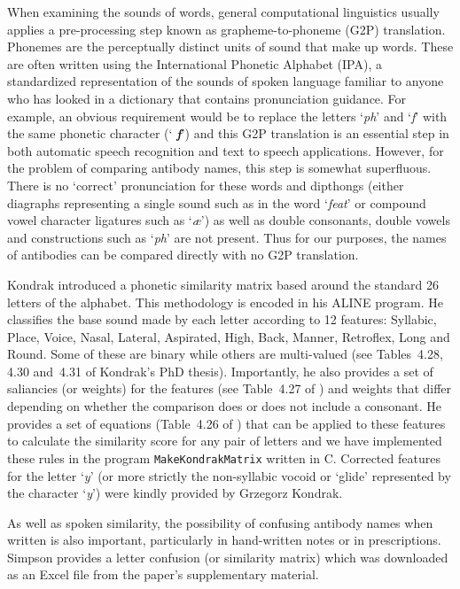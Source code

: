 \documentclass{article}
\newcommand{\eg}[1]{\mbox{`\emph{#1}'}}
\begin{document}
When examining the sounds of words, general computational linguistics
usually applies a pre-processing step known as grapheme-to-phoneme
(G2P) translation\cite{hixon:phonemicsimilarity}.  Phonemes are the perceptually
distinct units of sound that make up words. These are often written
using the International Phonetic Alphabet (IPA), a standardized
representation of the sounds of spoken
language\cite{mcmahon:phoneticnotation} familiar to anyone who has
looked in a dictionary that contains pronunciation guidance. For
example, an obvious requirement would be to replace the letters
\eg{ph} and \eg{f} with the same phonetic character (`{\bfseries\it
  f}') and this G2P translation is an essential step in both automatic
speech recognition and text to speech applications.  However, for the
problem of comparing antibody names, this step is somewhat
superfluous. There is no `correct' pronunciation for these words and
dipthongs (either diagraphs representing a single sound such as in the
word \eg{feat} or compound vowel character ligatures such as \eg{\ae})
as well as double consonants, double vowels and constructions such as
\eg{ph} are not present. Thus for our purposes, the names of
antibodies can be compared directly with no G2P translation.

Kondrak introduced a phonetic similarity matrix based around the
standard 26 letters of the
alphabet\cite{kondrak:paper,kondrak:thesis}. This methodology is
encoded in his ALINE program.  He classifies the base sound made by
each letter according to 12 features: Syllabic, Place, Voice, Nasal,
Lateral, Aspirated, High, Back, Manner, Retroflex, Long and
Round. Some of these are binary while others are multi-valued (see
Tables~4.28, 4.30 and~4.31 of Kondrak's PhD
thesis\cite{kondrak:thesis}).  Importantly, he also provides a set of
saliancies (or weights) for the features (see Table~4.27 of
\cite{kondrak:thesis}) and weights that differ depending on whether
the comparison does or does not include a consonant. He provides a set
of equations (Table~4.26 of \cite{kondrak:thesis}) that can be applied
to these features to calculate the similarity score for any pair of
letters and we have implemented these rules in the program
\verb|MakeKondrakMatrix| written in C.  Corrected features for the
letter \eg{y} (or more strictly the non-syllabic vocoid or `glide'
represented by the character \eg{y}) were kindly provided by Grzegorz
Kondrak.

As well as spoken similarity, the possibility of confusing antibody
names when written is also important, particularly in hand-written
notes or in prescriptions. Simpson\cite{simpson:visualsimilarity}
provides a letter confusion (or similarity matrix) which was
downloaded as an Excel file from the paper's supplementary material.
\end{document}

